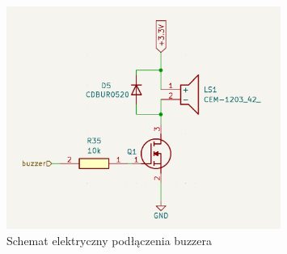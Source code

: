 \documentclass[../../main.tex]{subfiles}
\begin{document}
\begin{figure}[H]
    \centering
    \includegraphics[width=0.8\textwidth]{buzzer.png}
    \caption{Schemat elektryczny podłączenia buzzera}
    \label{fig:buzzer}
\end{figure}
\end{document}
